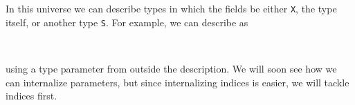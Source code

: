 In this universe we can describe types in which the fields be either \texttt{X}, the type itself, or another type \texttt{S}. For example, we can describe  as
\begin{code}%
%
\>[2]\AgdaSpace{}%
\AgdaSymbol{:}\AgdaSpace{}%
\AgdaSpace{}%
\AgdaSpace{}%
\<%
\\
%
\>[2]\AgdaSpace{}%
\AgdaSpace{}%
\AgdaSymbol{=}\AgdaSpace{}%
\AgdaSpace{}%
\AgdaSpace{}%
\AgdaSymbol{(}\AgdaSpace{}%
\AgdaSpace{}%
\AgdaSpace{}%
\AgdaBound{\AgdaUnderscore{}}\AgdaSpace{}%
\AgdaSpace{}%
\AgdaSpace{}%
\AgdaSymbol{)}\<%
\end{code}
using a type parameter from outside the description. We will soon see how we can internalize parameters, but since internalizing indices is easier, we will tackle indices first.

